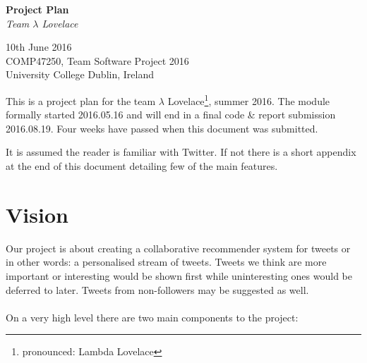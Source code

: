 \documentclass{article}
\begin{document}
\begin{center}
	{\LARGE \textbf{Project Plan}} \\
	\vspace{0.5em}
	\textsl{Team $\lambda$ Lovelace}
\end{center}

\vspace{0.5em}

\begin{center}
	10th June 2016 \\
	COMP47250, Team Software Project 2016 \\ 
	University College Dublin, Ireland \\
\end{center}

\vspace{0.5em}



\noindent This is a project plan for the team $\lambda$ Lovelace\footnote{pronounced: Lambda Lovelace}, summer 2016. The module formally started 2016.05.16 and will end in a final code \& report submission 2016.08.19. Four weeks have passed when this document was submitted.

It is assumed the reader is familiar with Twitter. If not there is a short appendix at the end of this document detailing few of the main features.


\section{Vision}
% 

Our project is about creating a collaborative recommender system for tweets or in other words: a personalised stream of tweets. Tweets we think are more important or interesting would be shown first while uninteresting ones would be deferred to later. Tweets from non-followers may be suggested as well.
\\\\
On a very high level there are two main components to the project:
\end{document}
